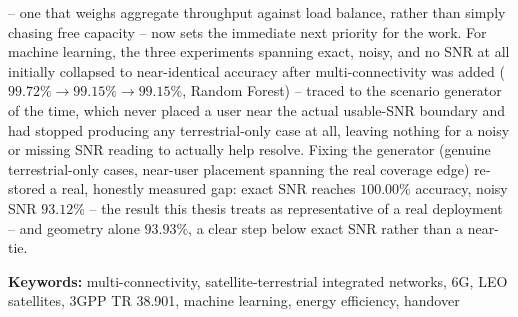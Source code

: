 \begin{english}
-- one that weighs aggregate throughput against load balance, rather
than simply chasing free capacity -- now sets the immediate next
priority for the work. For machine learning, the three
experiments spanning exact, noisy, and no SNR at all initially collapsed
to near-identical accuracy after multi-connectivity was added
($99.72\%\rightarrow99.15\%\rightarrow99.15\%$, Random Forest) --
traced to the scenario generator of the time, which never placed a user
near the actual usable-SNR boundary and had stopped producing any
terrestrial-only case at all, leaving nothing for a noisy or missing SNR
reading to actually help resolve. Fixing the generator (genuine
terrestrial-only cases, near-user placement spanning the real coverage
edge) restored a real, honestly measured gap: exact SNR reaches
$100.00\%$ accuracy, noisy SNR $93.12\%$ -- the result this thesis
treats as representative of a real deployment -- and geometry alone
$93.93\%$, a clear step below exact SNR rather than a near-tie.

\vspace{1em}
\noindent\textbf{Keywords:} multi-connectivity, satellite-terrestrial
integrated networks, 6G, LEO satellites, 3GPP TR 38.901, machine
learning, energy efficiency, handover

\end{english}
